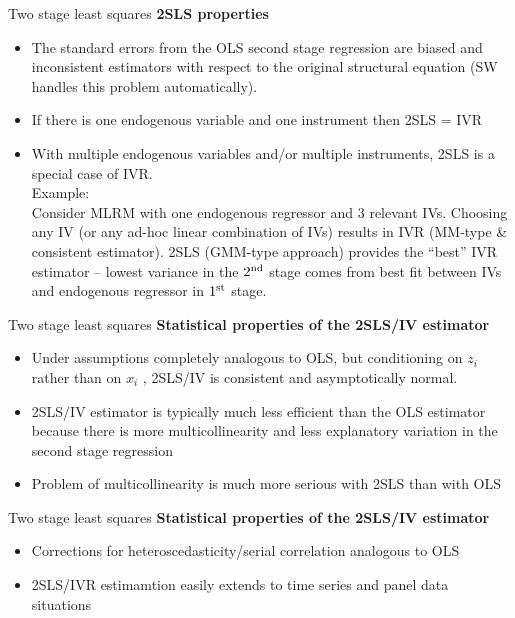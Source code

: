 \documentclass[usenames,dvipsnames]{beamer}
\begin{document}
\begin{frame}{Two stage least squares}
\textbf{2SLS properties}
\vspace{0.3cm}
\begin{itemize}
\item The standard errors from the OLS second stage regression are biased and inconsistent estimators with respect to the original structural equation (SW handles this problem automatically).
\vspace{0.3cm}
\item If there is one endogenous variable and one instrument then 2SLS = IVR
\vspace{0.3cm}
\item With multiple endogenous variables and/or multiple instruments, 2SLS is a special case of IVR.\\ \medskip
\footnotesize
Example:\\ Consider MLRM with one endogenous regressor and 3 relevant IVs. Choosing any IV (or any ad-hoc linear combination of IVs) results in IVR (MM-type \& consistent estimator). 2SLS (GMM-type approach) provides the ``best'' IVR estimator -- lowest variance in the $2^{\textnormal{nd}}$ stage comes from best fit between IVs and endogenous regressor in $1^{\textnormal{st}}$ stage.
\vspace{0.3cm}
\end{itemize}
\end{frame}
\begin{frame}{Two stage least squares}
\textbf{Statistical properties of the 2SLS/IV estimator}
\vspace{0.3cm}
\begin{itemize}
\item Under assumptions completely analogous to OLS, but conditioning on $z_i$ rather than on $x_i$ , 2SLS/IV is consistent and asymptotically normal.
\vspace{0.3cm}
\item 2SLS/IV estimator is typically much less efficient than the OLS estimator because there is more multicollinearity and less explanatory variation in the second stage regression
\vspace{0.3cm}
\item Problem of multicollinearity is much more serious with 2SLS than with OLS
\end{itemize}
\end{frame}
\begin{frame}{Two stage least squares}
\textbf{Statistical properties of the 2SLS/IV estimator}
\vspace{0.5cm}
\begin{itemize}
\item Corrections for heteroscedasticity/serial correlation analogous to OLS
\vspace{0.3cm}
\item 2SLS/IVR estimamtion easily extends to time series and panel data situations
\end{itemize}
\end{frame}
\end{document}
